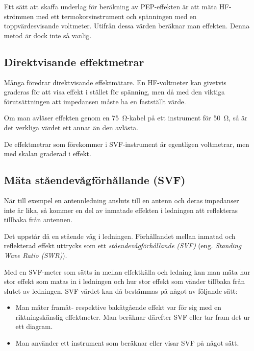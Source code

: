 Ett sätt att skaffa underlag för beräkning av PEP-effekten är att mäta
HF-strömmen med ett termokorsinstrument och spänningen med en
toppvärdesvisande voltmeter.
Utifrån dessa värden beräknar man effekten.
Denna metod är dock inte så vanlig.

\subsection{Direktvisande effektmetrar}

Många föredrar direktvisande effektmätare.
En HF-voltmeter kan givetvis graderas för att visa effekt i stället för
spänning, men då med den viktiga förutsättningen att impedansen måste ha en
fastställt värde.

Om man avläser effekten genom en \SI{75}{\ohm}-kabel på ett instrument för
\SI{50}{\ohm}, så är det verkliga värdet ett annat än den avlästa.

De effektmetrar som förekommer i SVF-instrument är egentligen voltmetrar,
men med skalan graderad i effekt.

\subsection{Mäta ståendevågförhållande (SVF)}
\label{mäta_ståendevåg}


När till exempel en antennledning ansluts till en antenn och deras impedanser
inte är lika, så kommer en del av inmatade effekten i ledningen att
reflekteras tillbaka från antennen.

Det uppstår då en stående våg i ledningen. Förhållandet mellan inmatad
och reflekterad effekt uttrycks som ett \emph{ståendevågförhållande (SVF)}
(eng. \emph{Standing Wave Ratio (SWR)}).

Med en SVF-meter som sätts in mellan effektkälla och ledning kan man
mäta hur stor effekt som matas in i ledningen och hur stor effekt som
vänder tillbaka från slutet av ledningen.
SVF-värdet kan då bestämmas på något av följande sätt:

\begin{itemize}
\item Man mäter framåt- respektive bakåtgående effekt var för sig med
  en riktningskänslig effektmeter.
  Man beräknar därefter SVF eller tar fram det ur ett diagram.
\item Man använder ett instrument som beräknar eller visar SVF på något sätt.
\end{itemize}

